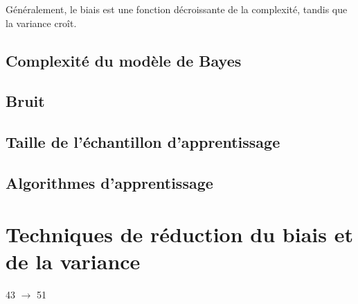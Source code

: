 		
		Généralement, le biais est une fonction décroissante de la complexité, tandis que la variance croît.
		
		\subsection{Complexité du modèle de Bayes}
		
		
		\subsection{Bruit}
		
		
		\subsection{Taille de l'échantillon d'apprentissage}
		
		
		\subsection{Algorithmes d'apprentissage}
		
		
	\section{Techniques de réduction du biais et de la variance}
	
	43 $\rightarrow$ 51
